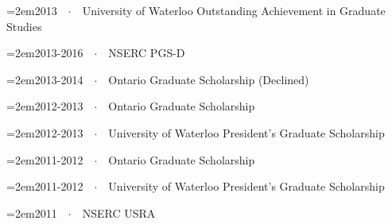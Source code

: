 \documentclass{scrartcl}
\newcommand{\MarginText}[1]{\marginpar{\raggedleft\itshape\small#1}} %
\newcommand{\Description}[1]{\hangindent=2em\hangafter=0\noindent\footnotesize{#1}\par\normalsize\vspace{1em}} %
\begin{document}
\begin{cv}{}
\Description{2013\ \ $\cdotp$\ \ University of Waterloo Outstanding Achievement in Graduate Studies}

\vspace{-0.5em} %

\Description{2013-2016\ \ $\cdotp$\ \ NSERC PGS-D}

\vspace{-0.5em} %

\Description{2013-2014\ \ $\cdotp$\ \ Ontario Graduate Scholarship (Declined)}


\vspace{-0.5em} %

\Description{2012-2013\ \ $\cdotp$\ \ Ontario Graduate Scholarship}


\vspace{-0.5em} %

\Description{2012-2013\ \ $\cdotp$\ \ University of Waterloo President's Graduate Scholarship}


\vspace{-0.5em} %

\Description{2011-2012\ \ $\cdotp$\ \ Ontario Graduate Scholarship}


\vspace{-0.5em} %

\Description{2011-2012\ \ $\cdotp$\ \ University of Waterloo President's Graduate Scholarship}

\vspace{-0.5em} %

\Description{2011\ \ $\cdotp$\ \ NSERC USRA}

\vspace{0.5em}



\end{cv}
\end{document}
